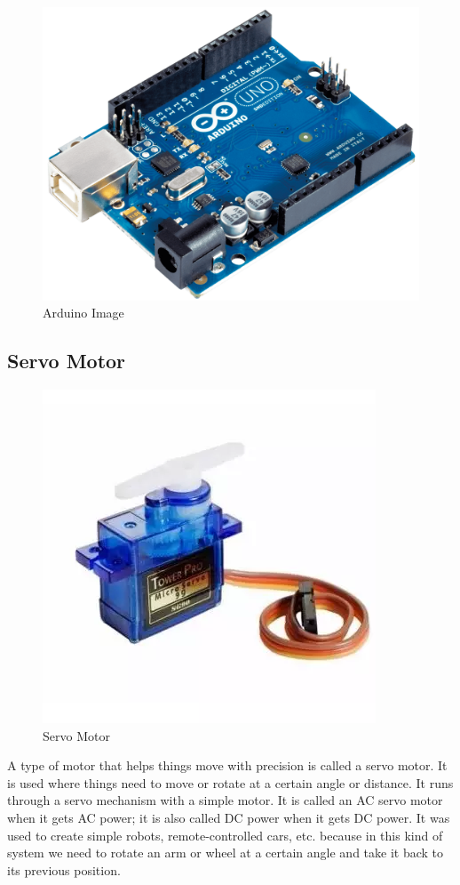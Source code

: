 \documentclass[conference]{IEEEtran}
\begin{document}
\begin{figure}
    \centering
    \includegraphics[width=0.5\linewidth]{Arduino Image.png}
    \caption{Arduino Image}
    \label{fig:enter-label}
\end{figure}
\subsection{Servo Motor}
\begin{figure}
    \centering
    \includegraphics[width=0.5\linewidth]{Servo.png}
    \caption{Servo Motor}
    \label{fig:enter-label}
\end{figure}


A type of motor that helps things move with precision is called a servo motor. It is used where things need to move or rotate at a certain angle or distance. It runs through a servo mechanism with a simple motor. It is called an AC servo motor when it gets AC power; it is also called DC power when it gets DC power.
 It was used to create simple robots, remote-controlled cars, etc. because in this kind of system we need to rotate an arm or wheel at a certain angle and take it back to its previous position. 
 
\end{document}
